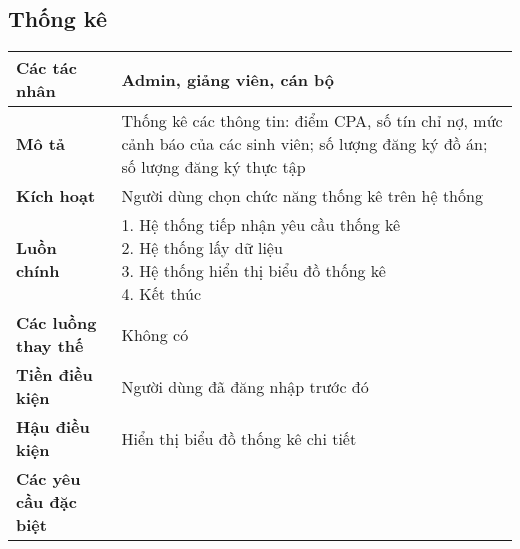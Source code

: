 \subsection{Thống kê}
\begin{tabular}{|l|p{}|}
	\hline
	\textbf{Các tác nhân}         & Admin, giảng viên, cán bộ                                                                                           \\
	\hline
	\textbf{Mô tả}                & Thống kê các thông tin: điểm CPA, số tín chỉ nợ, mức cảnh báo của các sinh viên; số lượng đăng ký đồ án; số lượng đăng ký thực tập \\
	\hline
	\textbf{Kích hoạt}            & Người dùng chọn chức năng thống kê trên hệ thống                                                                                   \\
	\hline
	\textbf{Luồn chính}           & \makecell[l]{1. Hệ thống tiếp nhận yêu cầu thống kê                                                                                \\ 2. Hệ thống lấy dữ liệu \\ 3. Hệ thống hiển thị biểu đồ thống kê \\ 4. Kết thúc} \\
	\hline
	\textbf{Các luồng thay thế}   & Không có                                                                                                                           \\
	\hline
	\textbf{Tiền điều kiện}       & Người dùng đã đăng nhập trước đó                                                                                                   \\
	\hline
	\textbf{Hậu điều kiện}        & Hiển thị biểu đồ thống kê chi tiết                                                                                                 \\
	\hline
	\textbf{Các yêu cầu đặc biệt} &                                                                                                                                    \\
	\hline
\end{tabular}

